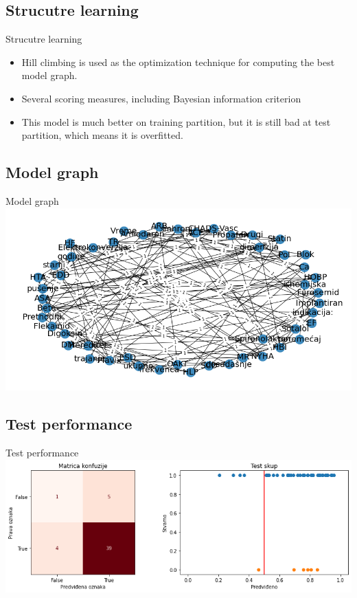 \documentclass[hyperref={bookmarks=false}]{beamer}
\begin{document}
\subsection{Strucutre learning}
\begin{frame}{Strucutre learning}
\begin{itemize}
    \item Hill climbing is used as the optimization technique for computing the best model graph.
    \item Several scoring measures, including Bayesian information criterion
    \item This model is much better on training partition, but it is still bad at test partition, which means it is overfitted.
\end{itemize}
\end{frame}

\subsection{Model graph}
\begin{frame}{Model graph}
\includegraphics[width=\textwidth]{learn1.png}
\end{frame}

\subsection{Test performance}
\begin{frame}{Test performance}
\includegraphics[width=\textwidth]{learn2.png}
\end{frame}
\end{document}

